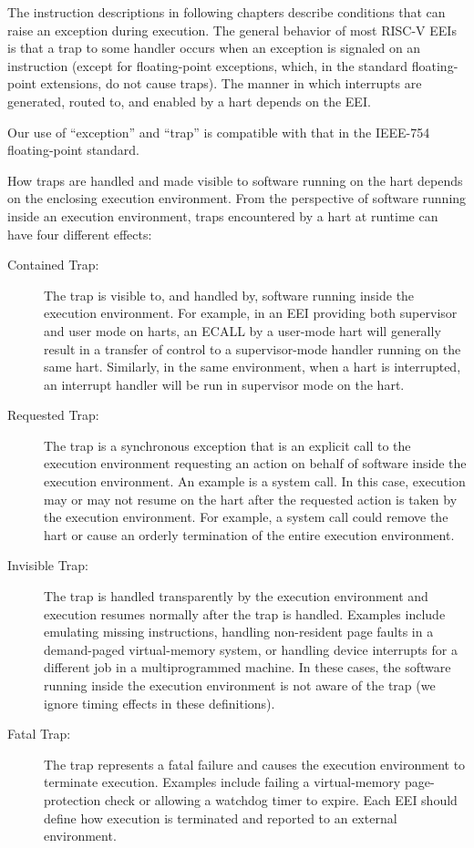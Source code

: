 The instruction descriptions in following chapters describe conditions
that can raise an exception during execution.  The general behavior of
most RISC-V EEIs is that a trap to some handler occurs when an
exception is signaled on an instruction (except for floating-point
exceptions, which, in the standard floating-point extensions, do not
cause traps).  The manner in which interrupts are generated, routed
to, and enabled by a hart depends on the EEI.

\begin{commentary}
Our use of ``exception'' and ``trap'' is compatible with that in the IEEE-754
floating-point standard.
\end{commentary}

How traps are handled and made visible to software running on the hart
depends on the enclosing execution environment.  From the perspective
of software running inside an execution environment, traps encountered
by a hart at runtime can have four different effects:
\begin{description}
  \item[Contained Trap:] The trap is visible to, and handled by,
    software running inside the execution environment.  For example,
    in an EEI providing both supervisor and user
    mode on harts, an ECALL by a user-mode hart will generally result
    in a transfer of control to a supervisor-mode handler running on
    the same hart.  Similarly, in the same environment, when a hart is
    interrupted, an interrupt handler will be run in supervisor mode
    on the hart.
  \item[Requested Trap:] The trap is a synchronous exception that is
    an explicit call to the execution environment requesting an action
    on behalf of software inside the execution environment.  An
    example is a system call.  In this case, execution may or may not
    resume on the hart after the requested action is taken by the
    execution environment.  For example, a system call could remove the
    hart or cause an orderly termination of the entire execution environment.
  \item[Invisible Trap:] The trap is handled transparently by the
    execution environment and execution resumes normally after the
    trap is handled.  Examples include emulating missing instructions,
    handling non-resident page faults in a demand-paged virtual-memory
    system, or handling device interrupts for a different job in a
    multiprogrammed machine.  In these cases, the software running
    inside the execution environment is not aware of the trap (we
    ignore timing effects in these definitions).
  \item[Fatal Trap:] The trap represents a fatal failure and causes
    the execution environment to terminate execution.  Examples
    include failing a virtual-memory page-protection check or allowing
    a watchdog timer to expire.  Each EEI should define how execution
    is terminated and reported to an external environment.
\end{description}

